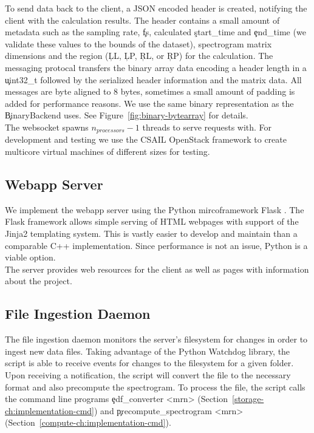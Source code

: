 To send data back to the client, a JSON encoded header is created, notifying
the client with the calculation results. The header contains a small amount of
metadata such as the sampling rate, \c{fs}, calculated \c{start\_time} and
\c{end\_time} (we validate these values to the bounds of the dataset),
spectrogram matrix dimensions and the region (\c{LL}, \c{LP}, \c{RL}, or
\c{RP}) for the calculation.  The messaging protocal transfers the binary array
data encoding a header length in a \c{uint32\_t} followed by the serialized
header information and the matrix data. All messages are byte aligned to 8
bytes, sometimes a small amount of padding is added for performance reasons.
We use the same binary representation as the \c{BinaryBackend} uses. See
Figure~\ref{fig:binary-bytearray} for details.\\

The websocket spawns $n_{processors} - 1$ threads to serve requests with. For
development and testing we use the CSAIL OpenStack framework to create
multicore virtual machines of different sizes for testing.

\subsection{Webapp Server}\label{compute-ch:implementation-webapp}

We implement the webapp server using the Python mircoframework Flask
\cite{flask}. The Flask framework allows simple serving of HTML webpages with
support of the Jinja2 \cite{jinja2} templating system. This is vastly easier to
develop and maintain than a comparable C++ implementation. Since performance is
not an issue, Python is a viable option. \\

The server provides web resources for the client as well as pages with
information about the project.

\subsection{File Ingestion Daemon}

The file ingestion daemon monitors the server's filesystem for changes in order
to ingest new data files. Taking advantage of the Python Watchdog
\cite{watchdog} library, the script is able to receive events for changes to
the filesystem for a given folder. Upon receiving a notification, the script
will convert the file to the necessary format and also precompute the
spectrogram. To process the file, the script calls the command line programs
\c{edf\_converter <mrn>} (Section~\ref{storage-ch:implementation-cmd}) and
\c{precompute\_spectrogram <mrn>}
(Section~\ref{compute-ch:implementation-cmd}). \\

